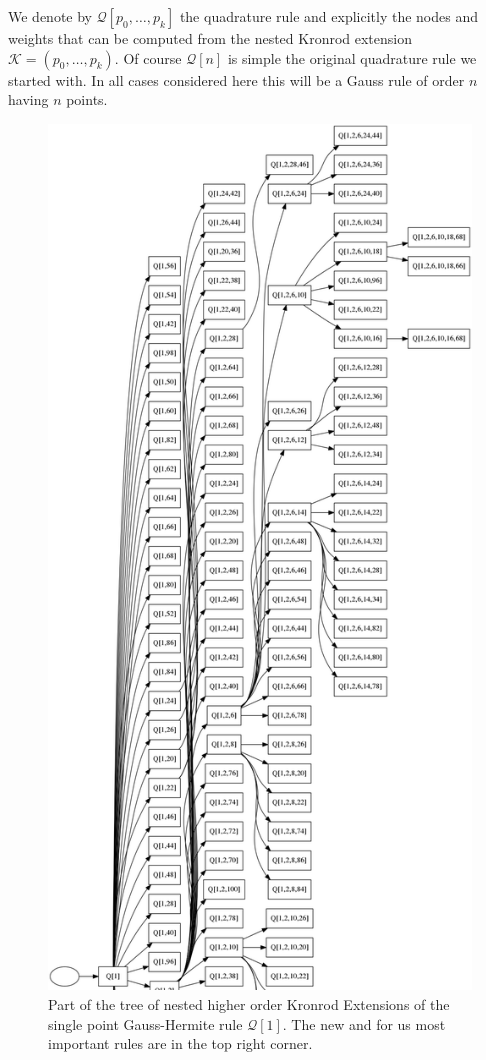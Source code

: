 \documentclass[a4paper,10pt]{article}
\begin{document}
We denote by $\mathcal{Q}[p_0, \ldots, p_k]$ the quadrature rule and explicitly
the nodes and weights that can be computed from the nested Kronrod extension
$\mathcal{K} = (p_0, \ldots, p_k)$. Of course $\mathcal{Q}[n]$ is simple the
original quadrature rule we started with. In all cases considered here this
will be a Gauss rule of order $n$ having $n$ points.

\begin{figure}
  \centering
  \includegraphics[width=0.8\linewidth]{./img/graph_hermite_1_100_6_part.png}
  \caption{Part of the tree of nested higher order Kronrod Extensions of the
  single point Gauss-Hermite rule $\mathcal{Q}[1]$.
  The new and for us most important rules are in the top right corner.}
  \label{fig:graph_1_100_6_part}
\end{figure}
\end{document}
